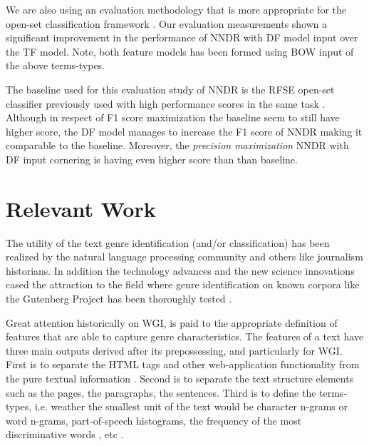\documentclass[runningheads]{llncs}
\begin{document}
We are also using an evaluation methodology that is more appropriate for the open-set classification framework \cite{mendesjunior2016,pritsos2018open}. Our evaluation measurements shown a significant improvement in the performance of NNDR with DF model input over the TF model. Note, both feature models has been formed using BOW input of the above terms-types. 

The baseline used for this evaluation study of  NNDR is the RFSE open-set classifier previously used with high performance scores in the same task \cite{pritsos2018open,pardo2009detecting,pritsos2015clef}. Although in respect of F1 score maximization the baseline seem to still have higher score, the DF model manages to increase the F1 score of NNDR making it comparable to the baseline. Moreover, the \textit{precision maximization} NNDR with DF input cornering is having even higher score than than baseline.

%
%
\section{Relevant Work}\label{sec:previous_work}

The utility of the text genre identification (and/or classification) has been realized by the natural language processing community and others like journalism historians. In addition the technology advances and the new science innovations cased the attraction to the field where genre identification on known corpora like the Gutenberg Project has been thoroughly tested \cite{bilgin2018utilizing}.

Great attention historically on WGI, is paid to the appropriate definition of features that are able to capture genre characteristics. The features of a text have three main outputs derived after its prepossessing, and particularly for WGI. First is to separate the HTML tags and other web-application functionality from the pure textual information \citep{Lim2005,levering2008using}. Second is to separate the text structure elements such as the pages, the paragraphs, the sentences. Third is to define the terms-types, i.e. weather the smallest unit of the text would be character n-grams or word n-grams, part-of-speech histograms, the frequency of the most discriminative words , etc \cite{kumari2014web,petrenz2011stable,mason2009n,sharoff2010web,onan2018ensemble}.
\end{document}
